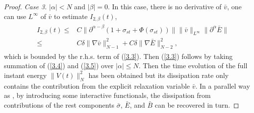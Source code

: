 \documentclass[11pt]{amsart}
\numberwithin{equation}{section}
\begin{document}
\begin{proof}
\textsl{Case 3.} $|\alpha|<N $ and $|\beta|=0$. In this case, there
is no derivative of $\bar{v}$, one can use $L^{\infty}$ of $\bar{v}$
to estimate $I_{2,\beta}(t)$,
\begin{eqnarray*}
 && \begin{aligned}
  I_{2,\beta}(t) \leq &  C\|\partial^{\alpha-\beta}(1+\sigma_{st}+\Phi(\sigma_{st}))\|
\|\bar{v}\|_{L^{\infty}}\|\partial^{\alpha}\bar{E}\|\\
  \leq &  C \delta \|\nabla \bar{v}\|_{N-1}^2+C \delta \|\nabla
  \bar{E}\|_{N-2}^2,
\end{aligned}
\end{eqnarray*}
which is bounded by the r.h.s. term of (\ref{3.3}). Then (\ref{3.3})
follows by taking summation of (\ref{3.4}) and (\ref{3.5}) over
$|\alpha| \leq N$. Then the time evolution of the full instant
energy $\|V(t)\|_{N}^{2}$ has been obtained but its dissipation rate
only contains the contribution from the explicit relaxation variable
$\bar{v}$. In a parallel way as \cite{Duan}, by introducing some
interactive functionals, the dissipation from contributions of the
rest components $\bar{\sigma}$, $\bar{E}$, and $\bar{B}$ can be
recovered in turn.

\medskip


\end{proof}
\end{document}
